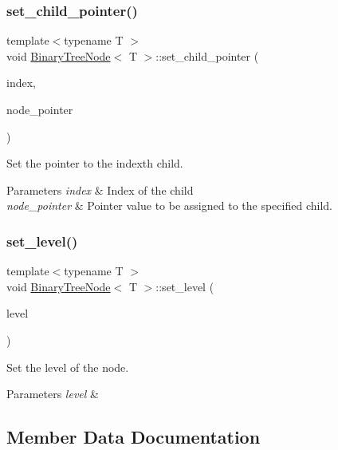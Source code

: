 \subsubsection{\texorpdfstring{set\+\_\+child\+\_\+pointer()}{set\_child\_pointer()}}
{\footnotesize\ttfamily template$<$typename T $>$ \\
void \hyperlink{classBinaryTreeNode}{Binary\+Tree\+Node}$<$ T $>$\+::set\+\_\+child\+\_\+pointer (\begin{DoxyParamCaption}\item[{std\+::size\+\_\+t}]{index,  }\item[{const \hyperlink{classBinaryTreeNode}{Binary\+Tree\+Node}$<$ T $>$ $\ast$}]{node\+\_\+pointer }\end{DoxyParamCaption})}

Set the pointer to the {\ttfamily index\textquotesingle{}th} child. 
\begin{DoxyParams}{Parameters}
{\em index} & Index of the child \\
\hline
{\em node\+\_\+pointer} & Pointer value to be assigned to the specified child. \\
\hline
\end{DoxyParams}
\mbox{\label{classBinaryTreeNode_ae420da1d4c6a4ac054cd181535e718f2}} 
\subsubsection{\texorpdfstring{set\+\_\+level()}{set\_level()}}
{\footnotesize\ttfamily template$<$typename T $>$ \\
void \hyperlink{classBinaryTreeNode}{Binary\+Tree\+Node}$<$ T $>$\+::set\+\_\+level (\begin{DoxyParamCaption}\item[{const unsigned int}]{level }\end{DoxyParamCaption})}

Set the level of the node. 
\begin{DoxyParams}{Parameters}
{\em level} & \\
\hline
\end{DoxyParams}


\subsection{Member Data Documentation}
\mbox{\label{classBinaryTreeNode_a434bfe00afd0b3dc86943e138f49fc3d}} 
